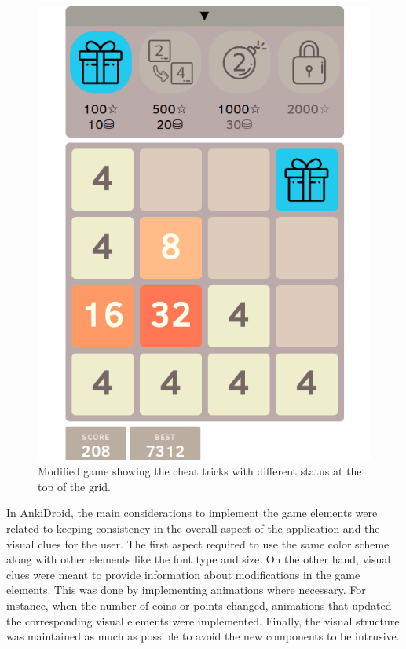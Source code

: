 \begin{figure}[htb]
    \vskip 5mm
        \begin{center}
            \includegraphics[scale=0.4]{./Figures/modified_game.png}
            \caption{Modified game showing the cheat tricks with different status at the top of the grid.}
            \label{fig:modified-game}
        \end{center}
    \vskip -5mm
\end{figure}

In AnkiDroid, the main considerations to implement the game elements were related to keeping consistency in the overall aspect of the application and the visual clues for the user. The first aspect required to use the same color scheme along with other elements like the font type and size. On the other hand, visual clues were meant to provide information about modifications in the game elements. This was done by implementing animations where necessary. For instance, when the number of coins or points changed, animations that updated the corresponding visual elements were implemented. Finally, the visual structure was maintained as much as possible to avoid the new components to be intrusive.







